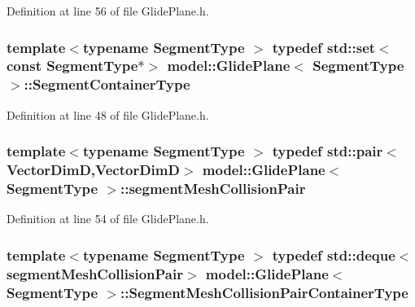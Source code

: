 Definition at line 56 of file Glide\+Plane.\+h.

\hypertarget{classmodel_1_1_glide_plane_a8b17e4dc70e2acbdd8ad502891c74fc2}{}
\subsubsection[{Segment\+Container\+Type}]{\setlength{\rightskip}{0pt plus 5cm}template$<$typename Segment\+Type $>$ typedef {\bf std\+::set}$<$const Segment\+Type$\ast$$>$ {\bf model\+::\+Glide\+Plane}$<$ Segment\+Type $>$\+::{\bf Segment\+Container\+Type}}\label{classmodel_1_1_glide_plane_a8b17e4dc70e2acbdd8ad502891c74fc2}


Definition at line 48 of file Glide\+Plane.\+h.

\hypertarget{classmodel_1_1_glide_plane_ad28fb04f6f870da35e376e3ffa602fbd}{}
\subsubsection[{segment\+Mesh\+Collision\+Pair}]{\setlength{\rightskip}{0pt plus 5cm}template$<$typename Segment\+Type $>$ typedef std\+::pair$<${\bf Vector\+Dim\+D},{\bf Vector\+Dim\+D}$>$ {\bf model\+::\+Glide\+Plane}$<$ Segment\+Type $>$\+::{\bf segment\+Mesh\+Collision\+Pair}}\label{classmodel_1_1_glide_plane_ad28fb04f6f870da35e376e3ffa602fbd}


Definition at line 54 of file Glide\+Plane.\+h.

\hypertarget{classmodel_1_1_glide_plane_a1fba1acd8a8051c426bc1f35f8c5ea94}{}
\subsubsection[{Segment\+Mesh\+Collision\+Pair\+Container\+Type}]{\setlength{\rightskip}{0pt plus 5cm}template$<$typename Segment\+Type $>$ typedef std\+::deque$<${\bf segment\+Mesh\+Collision\+Pair}$>$ {\bf model\+::\+Glide\+Plane}$<$ Segment\+Type $>$\+::{\bf Segment\+Mesh\+Collision\+Pair\+Container\+Type}}\label{classmodel_1_1_glide_plane_a1fba1acd8a8051c426bc1f35f8c5ea94}


